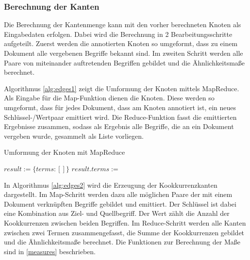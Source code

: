 \subsubsection{Berechnung der Kanten}

Die Berechnung der Kantenmenge kann mit den vorher berechneten Knoten als Eingabedaten erfolgen. Dabei wird die Berechnung in 2 Bearbeitungsschritte aufgeteilt. Zuerst werden die annotierten Knoten so umgeformt, dass zu einem Dokument alle vergebenen Begriffe bekannt sind. Im zweiten Schritt werden alle Paare von miteinander auftretenden Begriffen gebildet und die Ähnlichkeitsmaße berechnet.

Algorithmus \ref{alg:edges1} zeigt die Umformung der Knoten mittels MapReduce. Als Eingabe für die Map-Funktion dienen die Knoten. Diese werden so umgeformt, dass für jedes Dokument, dass am Knoten annotiert ist, ein neues Schlüssel-/Wertpaar emittiert wird. Die Reduce-Funktion fasst die emittierten Ergebnisse zusammen, sodass als Ergebnis alle Begriffe, die an ein Dokument vergeben wurde, gesammelt als Liste vorliegen.

\begin{algorithm}
\caption{Umformung der Knoten mit MapReduce
    \label{alg:edges1}}
    \begin{algorithmic}[1]
                \State {}
            \EndFor
        \EndFunction
        \Statex
            \State $result := \{terms: []\}$
                \State $result.terms :=$ 
            \EndFor
            \State {}
        \EndFunction
        \Statex
    \end{algorithmic}
\end{algorithm}

In Algorithmus \ref{alg:edges2} wird die Erzeugung der Kookkurrenzkanten dargestellt. Im Map-Schritt werden dazu alle möglichen Paare der mit einem Dokument verknüpften Begriffe gebildet und emittiert. Der Schlüssel ist dabei eine Kombination aus Ziel- und Quellbegriff. Der Wert zählt die Anzahl der Kookkurrenzen zwischen beiden Begriffen. Im Reduce-Schritt werden alle Kanten zwischen zwei Termen zusammengefasst, die Summe der Kookkurrenzen gebildet und die Ähnlichkeitsmaße berechnet. Die Funktionen zur Berechnung der Maße sind in \ref{measures} beschrieben.

